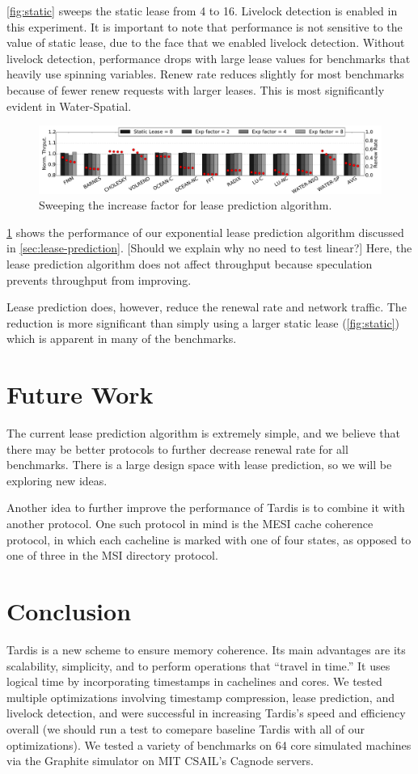 \documentclass[12pt]{article}
\begin{document}
\cref{fig:static} sweeps the static lease from 4 to 16. Livelock 
detection is enabled in this experiment. It is important to note that performance is not sensitive to the value of static lease, due to the face that we enabled livelock detection. Without livelock detection, performance drops with large lease values for benchmarks that heavily use spinning variables.
Renew rate reduces slightly for most benchmarks because of fewer renew requests with larger leases. This is most significantly evident in Water-Spatial.

\begin{figure}
	\centering
	\includegraphics[width=0.95\columnwidth]{figs/exp.pdf}
	\caption{ Sweeping the increase factor for lease prediction 
	algorithm.}
	\label{fig:exp}
\end{figure}

\cref{fig:exp} shows the performance of our exponential lease prediction algorithm 
discussed in \cref{sec:lease-prediction}. [Should we explain why no need to test linear?] Here, the lease prediction algorithm does not affect throughput because speculation prevents throughput from improving.

Lease prediction does, however, reduce the renewal rate and network traffic. The reduction is more significant than simply using a larger static lease (\cref{fig:static}) which is apparent in many of the benchmarks.

\section{Future Work}
The current lease prediction algorithm is extremely simple, and we believe that there may be better protocols to further decrease renewal rate for all benchmarks. There is a large design space with lease prediction, so we will be exploring new ideas.

Another idea to further improve the performance of Tardis is to combine it with another protocol. One such protocol in mind is the MESI cache coherence protocol, in which each cacheline is marked with one of four states, as opposed to one of three in the MSI directory protocol.

\section{Conclusion}
	Tardis is a new scheme to ensure memory coherence. Its main advantages are its scalability, simplicity, and to perform operations that “travel in time.” It uses logical time by incorporating timestamps in cachelines and cores. We tested multiple optimizations involving timestamp compression, lease prediction, and livelock detection, and were successful in increasing Tardis’s speed and efficiency overall (we should run a test to comepare baseline Tardis with all of our optimizations). We tested a variety of benchmarks on 64 core simulated machines via the Graphite simulator on MIT CSAIL’s Cagnode servers.

{
	
	
}
\end{document}
